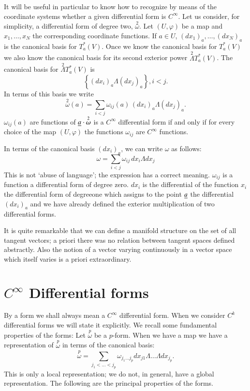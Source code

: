 It will be useful in particular to know how to recognize by means of
the coordinate systems whether a given differential form is
$C^{\infty}$. Let us consider, for simplicity, a differential form of
degree two, $\overset{2}{\omega}$. Let $(U,\varphi)$ be a map and
$x_{1},\ldots,x_{N}$ the corresponding coordinate functions. If $a\in
U$, $(dx_{1})_{a},\ldots,(dx_{N})_{a}$ is the canonical basis for
$T^{\ast}_{a}(V)$. Once we know the canonical basis for
$T^{\ast}_{a}(V)$ we also know the canonical basis for its second
exterior power $\overset{2}{\Lambda}T^{\ast}_{a}(V)$. The canonical
basis for $\overset{2}{\Lambda}T^{\ast}_{a}(V)$ is 
$$
\left\{(dx_{i})_{a}\Lambda (dx_{j})_{a}\right\},i<j.
$$
In terms of this basis we write
$$
\overset{2}{\omega}(a)=\sum_{i<j}\omega_{ij}(a)\,(dx_{i})_{a}\Lambda
(dx_{j})_{a}. 
$$
$\omega_{ij}(a)$ are functions of $\underline{a}\cdot \overset{2}{\omega}$ is
a $C^{\infty}$ differential form if and only if for every choice of
the map $(U,\varphi)$ the functions $\omega_{ij}$ are $C^{\infty}$
functions.

In terms of the canonical basis $(dx_{i})_{a}$, we can write $\omega$
as follows:
$$
\omega=\sum_{i<j}\omega_{ij} \, dx_{i}\Lambda dx_{j}
$$
This is not `abuse of language'; the expression has a correct
meaning. $\omega_{ij}$ is a function \iec a differential form of
degree zero. $dx_{i}$ is the differential of the function $x_{i}$ \iec
the differential form of degree\pageoriginale one which assigns to the
point $\underline{a}$ the differential $(dx_{i})_{a}$ and we have already
defined the exterior multiplication of two differential forms.

It is quite remarkable that we can define a manifold structure on the
set of all tangent vectors; a priori there was no relation between
tangent spaces defined abstractly. Also the notion of a vector varying
continuously in a vector space which itself varies is a priori
extraordinary.

\section*{$C^{\infty}$ Differential forms}

By a form we shall always mean a $C^{\infty}$ differential form. When
we consider $C^{k}$ differential forms we will state it explicitly. We
recall some fundamental properties of the forms: Let
$\overset{p}{\omega}$ be a $p$-form. When we have a map we have a
representation of $\overset{p}{\omega}$ in terms of the canonical
basis:
$$
\overset{p}{\omega}=\sum_{j_{1}<\ldots<j_{p}}\omega_{j_{1}\ldots
j_{p}}dx_{j1}\Lambda\ldots\Lambda dx_{j_{p}}.
$$
This is only a local representation; we do not, in general, have a
global representation. The following are the principal properties of
the forms.

